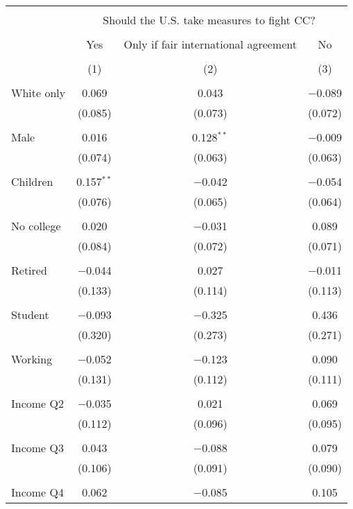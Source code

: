 
\begin{tabular}{@{\extracolsep{5pt}}lccc} 
\\[-1.8ex]\hline 
\hline \\[-1.8ex] 
 & \multicolumn{3}{c}{Should the U.S. take measures to fight CC?} \\ 
\cline{2-4} 
\\[-1.8ex] & Yes & Only if fair international agreement & No \\ 
\\[-1.8ex] & (1) & (2) & (3)\\ 
\hline \\[-1.8ex] 
 White only & 0.069 & 0.043 & $-$0.089 \\ 
  & (0.085) & (0.073) & (0.072) \\ 
  & & & \\ 
 Male & 0.016 & 0.128$^{**}$ & $-$0.009 \\ 
  & (0.074) & (0.063) & (0.063) \\ 
  & & & \\ 
 Children & 0.157$^{**}$ & $-$0.042 & $-$0.054 \\ 
  & (0.076) & (0.065) & (0.064) \\ 
  & & & \\ 
 No college & 0.020 & $-$0.031 & 0.089 \\ 
  & (0.084) & (0.072) & (0.071) \\ 
  & & & \\ 
 Retired & $-$0.044 & 0.027 & $-$0.011 \\ 
  & (0.133) & (0.114) & (0.113) \\ 
  & & & \\ 
 Student & $-$0.093 & $-$0.325 & 0.436 \\ 
  & (0.320) & (0.273) & (0.271) \\ 
  & & & \\ 
 Working & $-$0.052 & $-$0.123 & 0.090 \\ 
  & (0.131) & (0.112) & (0.111) \\ 
  & & & \\ 
 Income Q2 & $-$0.035 & 0.021 & 0.069 \\ 
  & (0.112) & (0.096) & (0.095) \\ 
  & & & \\ 
 Income Q3 & 0.043 & $-$0.088 & 0.079 \\ 
  & (0.106) & (0.091) & (0.090) \\ 
  & & & \\ 
 Income Q4 & 0.062 & $-$0.085 & 0.105 \\ 

\end{tabular}
